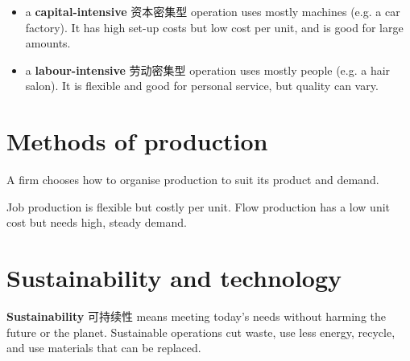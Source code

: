 \documentclass[11pt]{article}
\begin{document}
\begin{itemize}
\item a \textbf{capital-intensive} 资本密集型 operation uses mostly machines (e.g. a car factory). It has high set-up costs but low cost per unit, and is good for large amounts.

\item a \textbf{labour-intensive} 劳动密集型 operation uses mostly people (e.g. a hair salon). It is flexible and good for personal service, but quality can vary.

\end{itemize}

\section*{Methods of production}

A firm chooses how to organise production to suit its product and demand.

\begin{center}
\end{center}

Job production is flexible but costly per unit. Flow production has a low unit cost but needs high, steady demand.

\section*{Sustainability and technology}

\textbf{Sustainability} 可持续性 means meeting today's needs without harming the future or the planet. Sustainable operations cut waste, use less energy, recycle, and use materials that can be replaced.
\end{document}
